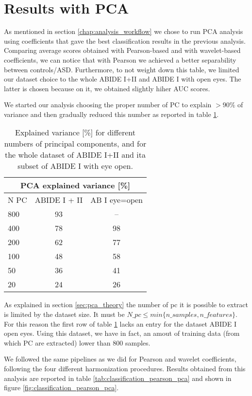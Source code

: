 \documentclass[11pt]{report}
\begin{document}
\newpage


\section{Results with PCA}\label{sec:results_pca}

As mentioned in section \ref{chap:analysis_workflow} we chose to run PCA analysis using coefficients that gave the best classification results in the previous analysis.
Comparing average scores obtained with Pearson-based and with wavelet-based coefficients, we can notice that with Pearson we achieved a better separability between controls/ASD. 
Furthermore, to not weight down this table, we limited our dataset choice to the whole ABIDE I+II and ABIDE I with open eyes.
The latter is chosen because on it, we obtained slightly hiher AUC scores.

We started our analysis choosing the proper number of PC to explain $> 90\%$ of variance and then gradually reduced this number as reported in table \ref{tab:pca_explained}.

\begin{table}[h]
\centering
\begin{tabular}{ |l|c c| }
\hline
\multicolumn{3}{|c|}{PCA explained variance [\%]} \\
 \hline
  N PC & ABIDE I + II  & AB I eye=open \\
  \hline
 800 & 93 & -- \\
 400 & 78 & 98 \\
 200 & 62 & 77 \\
 100 &48 & 58 \\
 50 & 36 & 41 \\
 20 & 24 & 26\\
 \hline
\end{tabular}
\caption{Explained variance [\%] for different numbers of principal components, and for the whole dataset of ABIDE I+II and ita subset of ABIDE I with eye open.}
\label{tab:pca_explained}
\end{table}

As explained in section \ref{sec:pca_theory} the number of pc it is possible to extract is limited by the dataset size.
It must be $N\_pc \leq min\{n\_samples, n\_features\}$.
For this reason the first row of table \ref{tab:pca_explained}
lacks an entry for the dataset ABIDE I open eyes.
Using this dataset, we have in fact, an amout of training data (from which PC are extracted) lower than 800 samples.

We followed the same pipelines as we did for Pearson and wavelet coefficients, following the four different harmonization procedures.
Results obtained from this analysis are reported in table \ref{tab:classification_pearson_pca} and shown in figure \ref{fig:classification_pearson_pca}.
\end{document}
